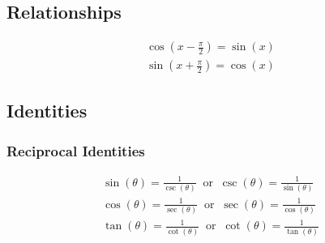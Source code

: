 \documentclass[12pt letter]{report}
\begin{document}
\qs{}{
	\[
		y = \sin^{-1}(5x+9)
	\]
}

\qs{}{
	\[
		y = \sin^{-1}(x)
	\]
}
\sol{

}

\qs{}{
	\[
		y = \cos^{-1}(x)
	\]
}
\sol{

}

\chapter{}
\section{Relationships}

\begin{align*}
	\cos(x-\frac{\pi}{2}) = \sin(x) \\
	\sin(x + \frac{\pi}{2}) = \cos(x)
\end{align*}

\section{Identities}
\subsection{Reciprocal Identities}

\begin{align*}
	\sin(\theta) = \frac{1}{\csc(\theta)} \;\; \text{or} \;\; \csc(\theta) = \frac{1}{\sin(\theta)} \\[20pt]
	\cos(\theta) = \frac{1}{\sec(\theta)}\;\; \text{or} \;\;\sec(\theta) = \frac{1}{\cos(\theta)}   \\[20pt]
	\tan(\theta) = \frac{1}{\cot(\theta)}\;\; \text{or} \;\; \cot(\theta) = \frac{1}{\tan(\theta)}
\end{align*}
\end{document}
